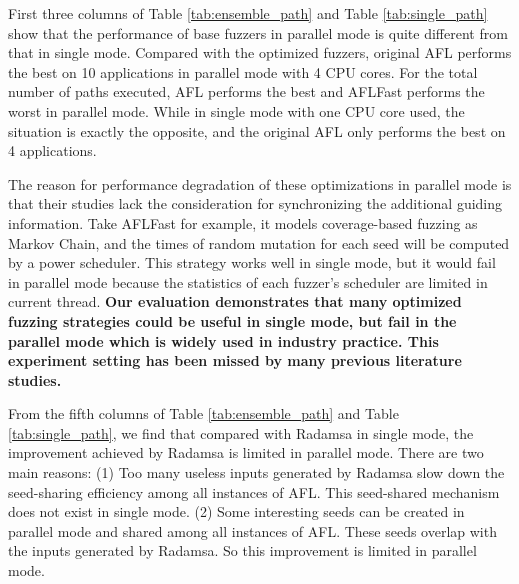 First three columns of Table \ref{tab:ensemble_path} and Table \ref{tab:single_path} show that the performance of base fuzzers in parallel mode is quite different from that in single mode. Compared with the optimized fuzzers, original AFL performs the best on 10 applications in parallel mode with 4 CPU cores. For the total number of paths executed, AFL performs the best and AFLFast performs the worst in parallel mode. While in single mode with one CPU core used, the situation is exactly the opposite, and the original AFL only performs the best on 4 applications. 


The reason for performance degradation of these optimizations in parallel mode is that their studies lack the consideration for synchronizing the  additional guiding information.
Take AFLFast for example, it models coverage-based fuzzing as Markov Chain, and the times of random mutation for each seed will be computed by a power scheduler. This strategy works well in single mode, %
but it would fail in parallel mode because the statistics of each fuzzer's scheduler are limited in current thread. %
\textbf{Our evaluation demonstrates that many optimized fuzzing strategies could be useful in single mode, but fail in the parallel mode which is widely used in industry practice. This experiment setting has been missed by many previous literature studies.} 




From the fifth columns of Table \ref{tab:ensemble_path} and Table \ref{tab:single_path}, we find that compared with Radamsa in single mode, the improvement achieved by Radamsa is limited in parallel mode. There are two main reasons:
(1) Too many useless inputs generated by Radamsa slow down the seed-sharing efficiency among all instances of AFL. This seed-shared mechanism does not exist in single mode.
(2) Some interesting seeds can be created in parallel mode and shared among all instances of AFL. 
These seeds overlap with the inputs generated by Radamsa. So this improvement is limited in parallel mode.


